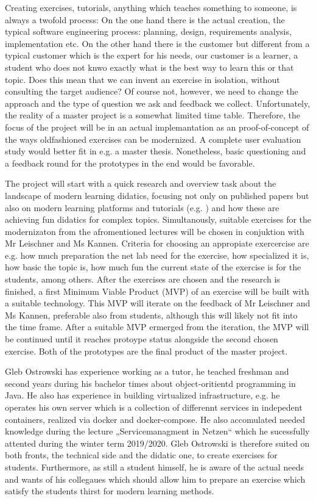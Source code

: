 Creating exercises, tutorials, anything which teaches something to someone, is always a twofold process: On the one hand there is the actual creation, the typical software engineering process: planning, design, requirements analysis, implementation etc. On the other hand there is the customer but different from a typical customer which is the expert for his needs, our customer is a learner, a student who does not knwo exactly what is the best way to learn this or that topic. Does this mean that we can invent an exercise in isolation, without consulting the target audience? Of course not, however, we need to change the approach and the type of question we ask and feedback we collect.
Unfortunately, the reality of a master project is a somewhat limited time table. Therefore, the focus of the project will be in an actual implemantation as an proof-of-concept of the ways oldfashioned exercises can be modernized.
A complete user evaluation study would better fit in e.g. a master thesis.
Nonetheless, basic questioning and a feedback round for the prototypes in the end would be favorable.

The project will start with a quick research and overview task about the landscape of modern learning didatics, focusing not only on published papers but also on modern learning platforms and tutorials 
(e.g. )
and how these are achieving fun didatics for complex topics.
Simultanously, suitable exercises for the modernizaton from the afromentioned lectures will be chosen in conjuktion with Mr Leischner and Ms Kannen. Criteria for choosing an appropiate exercercise are e.g. how much preparation the net lab need for the exercise, how specialized it is, how basic the topic is, how much fun the current state of the exercise is for the students, among others.
After the exercises are chosen and the research is finished, a first Minimum Viable Product (MVP) of an exercise will be built with a suitable technology. This MVP will iterate on the feedback of Mr Leischner and Ms Kannen, preferable also from students, although this will likely not fit into the time frame.
After a suitable MVP ermerged from the iteration, the MVP will be continued until it reaches protoype status alongside the second chosen exercise. Both of the prototypes are the final product of the master project.

Gleb Ostrowski has experience working as a tutor, he teached freshman and second years during his bachelor times about object-oritientd programming in Java. He also has experience in building virtualized infrastructure, e.g. he operates his own server which is a collection of differennt services in indepedent containers, realized via docker and docker-compose. He also accomulated needed knowledge during the lecture „Servicemanagment in Netzen“ which he sucessfully attented during the winter term 2019/2020.
Gleb Ostrowski is therefore suited on both fronts, the technical side and the didatic one, to create exercises for students. Furthermore, as still a student himself, he is aware of the actual needs and wants of his collegaues which should allow him to prepare an exercise which satisfy the students thirst for modern learning methods.
